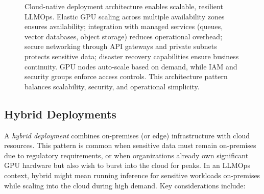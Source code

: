 \begin{figure}[tb]
\begin{llmfigbox}
  \end{llmfigbox}
  \caption{Cloud-native deployment architecture enables scalable, resilient LLMOps. Elastic GPU scaling across multiple availability zones ensures availability; integration with managed services (queues, vector databases, object storage) reduces operational overhead; secure networking through API gateways and private subnets protects sensitive data; disaster recovery capabilities ensure business continuity. GPU nodes auto-scale based on demand, while IAM and security groups enforce access controls. This architecture pattern balances scalability, security, and operational simplicity.}
  \label{fig:ch03_cloud_native_deployment}
\end{figure}

\subsection{Hybrid Deployments}
\label{sec:deploy-hybrid}

A \emph{hybrid deployment} combines on-premises (or edge) infrastructure with cloud resources. 
This pattern is common when sensitive data must remain on-premises due to regulatory requirements, or when organizations already own significant GPU hardware but also wish to burst into the cloud for peaks. 
In an LLMOps context, hybrid might mean running inference for sensitive workloads on-premises while scaling into the cloud during high demand. 
Key considerations include:

